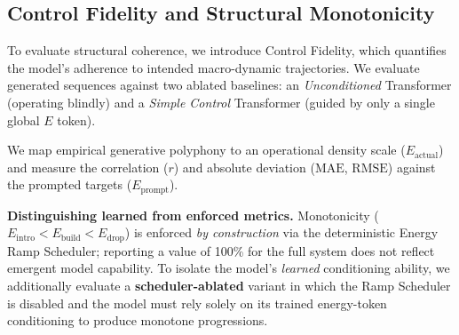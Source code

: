 \documentclass[conference]{IEEEtran}
\begin{document}
\subsection{Control Fidelity and Structural Monotonicity}
To evaluate structural coherence, we introduce Control Fidelity, which quantifies the model's adherence to intended macro-dynamic trajectories. We evaluate generated sequences against two ablated baselines: an \textit{Unconditioned} Transformer (operating blindly) and a \textit{Simple Control} Transformer (guided by only a single global $E$ token).

We map empirical generative polyphony to an operational density scale ($E_{\text{actual}}$) and measure the correlation ($r$) and absolute deviation ($\text{MAE}$, $\text{RMSE}$) against the prompted targets ($E_{\text{prompt}}$).

\textbf{Distinguishing learned from enforced metrics.}
Monotonicity ($E_{\text{intro}} < E_{\text{build}} < E_{\text{drop}}$) is enforced \emph{by construction} via the deterministic Energy Ramp Scheduler; reporting a value of 100\% for the full system does not reflect emergent model capability.
To isolate the model's \emph{learned} conditioning ability, we additionally evaluate a \textbf{scheduler-ablated} variant in which the Ramp Scheduler is disabled and the model must rely solely on its trained energy-token conditioning to produce monotone progressions.
\end{document}
